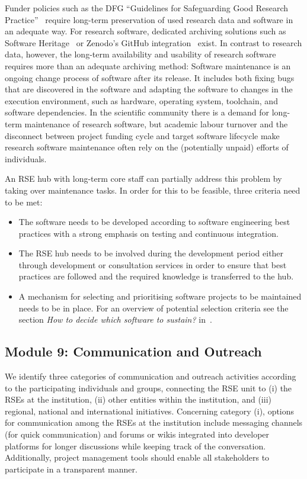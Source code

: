 \documentclass[a4paper]{article}
\begin{document}
Funder policies such as the DFG “Guidelines for Safeguarding Good Research Practice”~\autocite{dfg_gsp} require long-term preservation of used research data and software in an adequate way.
For research software, dedicated archiving solutions such as Software Heritage~\autocite{DiCosmo2020,DiCosmo2023} or Zenodo's GitHub integration~\autocite{GitHubZenodo} exist.
In contrast to research data, however, the long-term availability and usability of research software requires more than an adequate archiving method:
Software maintenance is an ongoing change process of software after its release.
It includes both fixing bugs that are discovered in the software and adapting the software to changes in the execution environment, such as hardware, operating system, toolchain, and software dependencies.
In the scientific community there is a demand for long-term maintenance of research software,
 but academic labour turnover and the disconnect between project funding cycle and target software lifecycle make research software maintenance often rely on the (potentially unpaid) efforts of individuals.

An RSE hub with long-term core staff can partially address this problem by taking over maintenance tasks.
In order for this to be feasible, three criteria need to be met:

\begin{itemize}
\item The software needs to be developed according to software engineering best practices with a strong emphasis on testing and continuous integration.
\item The RSE hub needs to be involved during the development period either through development or consultation services in order to ensure that best practices are followed and the required knowledge is transferred to the hub.
\item A mechanism for selecting and prioritising software projects to be maintained needs to be in place. For an overview of potential selection criteria see the section \textit{How to decide which software to sustain?} in~\cite{Anzt2021}.
\end{itemize}

\subsection{Module 9: Communication and Outreach}%
\label{sec:outreach}

We identify three categories of communication and outreach activities according to the participating individuals and groups, connecting the RSE unit to (i) the RSEs at the institution, (ii) other entities within the institution, and (iii) regional, national and international initiatives.
Concerning category (i), options for communication among the RSEs at the institution include messaging channels (for quick communication) and forums or wikis integrated into developer platforms for longer discussions while keeping track of the conversation.
Additionally, project management tools should enable all stakeholders to participate in a transparent manner.
\end{document}
